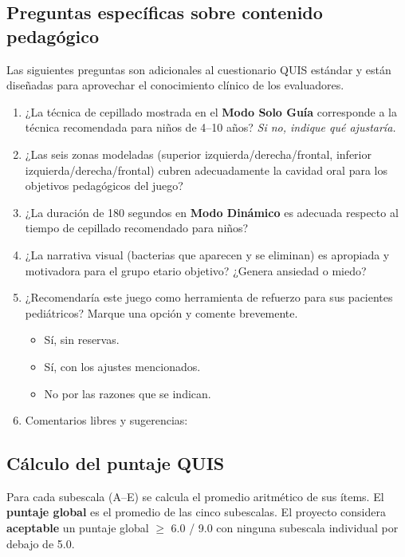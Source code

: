 \documentclass[12pt, a4paper]{article}
\begin{document}
\subsection{Preguntas específicas sobre contenido pedagógico}

Las siguientes preguntas son adicionales al cuestionario QUIS estándar y
están diseñadas para aprovechar el conocimiento clínico de los evaluadores.

\begin{enumerate}[leftmargin=1.5cm, itemsep=5pt]
  \item ¿La técnica de cepillado mostrada en el \textbf{Modo Solo Guía}
        corresponde a la técnica recomendada para niños de 4--10 años?
        \textit{Si no, indique qué ajustaría.}
  \item ¿Las seis zonas modeladas (superior izquierda/derecha/frontal,
        inferior izquierda/derecha/frontal) cubren adecuadamente la cavidad
        oral para los objetivos pedagógicos del juego?
  \item ¿La duración de 180 segundos en \textbf{Modo Dinámico} es adecuada
        respecto al tiempo de cepillado recomendado para niños?
  \item ¿La narrativa visual (bacterias que aparecen y se eliminan) es
        apropiada y motivadora para el grupo etario objetivo?
        ¿Genera ansiedad o miedo?
  \item ¿Recomendaría este juego como herramienta de refuerzo para sus
        pacientes pediátricos? Marque una opción y comente brevemente.

  \begin{itemize}[leftmargin=2cm]
    \item[$\square$] Sí, sin reservas.
    \item[$\square$] Sí, con los ajustes mencionados.
    \item[$\square$] No por las razones que se indican.
  \end{itemize}
  \item Comentarios libres y sugerencias:\\[2cm]
\end{enumerate}

\subsection{Cálculo del puntaje QUIS}

Para cada subescala (A--E) se calcula el promedio aritmético de sus ítems.
El \textbf{puntaje global} es el promedio de las cinco subescalas. El
proyecto considera \textbf{aceptable} un puntaje global $\geq$ 6.0 / 9.0
con ninguna subescala individual por debajo de 5.0.
\end{document}
